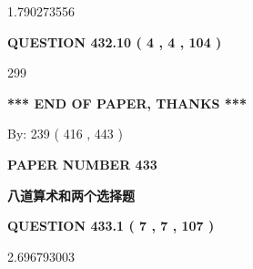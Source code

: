 \documentclass{ctexart}
\begin{document}
  
 
 
\noindent{}

1.790273556
 
 
  
\vspace{0.2in}
  
{\textbf{\Large{QUESTION
432.10 
 ( 4 , 4 , 104 )
}}}
  
  
 
 
\noindent{}

299
 
 
   
   
 \vspace{0.2in}
 
   
   
   
   
\vspace{1.0in} 
{\textbf{\large{ *** END OF PAPER, THANKS *** }}} 
   
   
\hspace{1.0in} By: 
 239 ( 416 ,  443 )
   
   
   
   
\newpage 
\setcounter{page}{ 
   433001 } 
   
   
   
   
 {\textbf{ \Large{ PAPER NUMBER  433  }}}
   
   
\vspace{0.2in}
   
   
   
   
   
   
 \vspace{0.2in}
{\LARGE {\textbf{ 八道算术和两个选择题}}}
   
   
  
\vspace{0.2in}
  
{\textbf{\Large{QUESTION
433.1 
 ( 7 , 7 , 107 )
}}}
  
  
 
 
\noindent{}

2.696793003
 
 
  
\vspace{0.2in}
  
\end{document}

